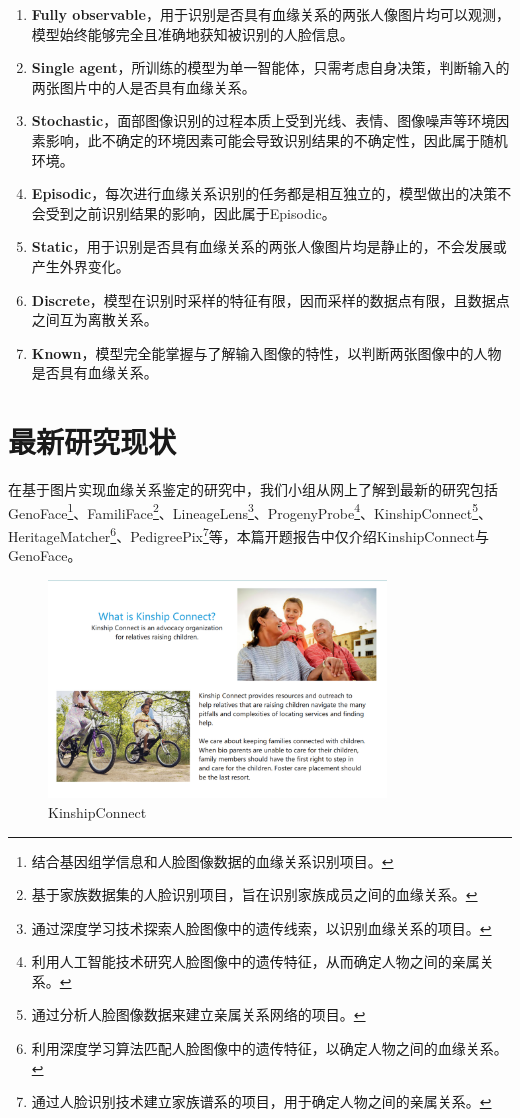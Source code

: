 \documentclass[UTF8]{ctexart}
\begin{document}
\begin{enumerate}
  \item \textbf{Fully observable}，用于识别是否具有血缘关系的两张人像图片均可以观测，模型始终能够完全且准确地获知被识别的人脸信息。
  \item \textbf{Single agent}，所训练的模型为单一智能体，只需考虑自身决策，判断输入的两张图片中的人是否具有血缘关系。
  \item \textbf{Stochastic}，面部图像识别的过程本质上受到光线、表情、图像噪声等环境因素影响，此不确定的环境因素可能会导致识别结果的不确定性，因此属于随机环境。
  \item \textbf{Episodic}，每次进行血缘关系识别的任务都是相互独立的，模型做出的决策不会受到之前识别结果的影响，因此属于Episodic。
  \item \textbf{Static}，用于识别是否具有血缘关系的两张人像图片均是静止的，不会发展或产生外界变化。
  \item \textbf{Discrete}，模型在识别时采样的特征有限，因而采样的数据点有限，且数据点之间互为离散关系。
  \item \textbf{Known}，模型完全能掌握与了解输入图像的特性，以判断两张图像中的人物是否具有血缘关系。
\end{enumerate}

\section{最新研究现状}
在基于图片实现血缘关系鉴定的研究中，我们小组从网上了解到最新的研究包括GenoFace\footnote{结合基因组学信息和人脸图像数据的血缘关系识别项目。}、FamiliFace\footnote{基于家族数据集的人脸识别项目，旨在识别家族成员之间的血缘关系。}、LineageLens\footnote{通过深度学习技术探索人脸图像中的遗传线索，以识别血缘关系的项目。}、ProgenyProbe\footnote{利用人工智能技术研究人脸图像中的遗传特征，从而确定人物之间的亲属关系。}、KinshipConnect\footnote{通过分析人脸图像数据来建立亲属关系网络的项目。}、HeritageMatcher\footnote{利用深度学习算法匹配人脸图像中的遗传特征，以确定人物之间的血缘关系。}、PedigreePix\footnote{通过人脸识别技术建立家族谱系的项目，用于确定人物之间的亲属关系。}等，本篇开题报告中仅介绍KinshipConnect与GenoFace。

\begin{figure}[!ht]
  \centering
  \includegraphics[width=0.8\textwidth]{KinshipConnect.png}
  \caption{KinshipConnect}
  \label{fig:KinshipConnect}
\end{figure}
\end{document}
